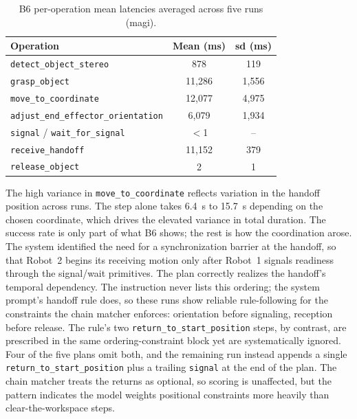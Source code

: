 \begin{table}[t]
	\centering
	\begin{tabular}{lcc}
		\hline
		\textbf{Operation}                           & \textbf{Mean (ms)} & \textbf{\gls{sd} (ms)} \\
		\hline
		\texttt{detect\_object\_stereo}              & 878                & 119                    \\
		\texttt{grasp\_object}                       & 11{,}286           & 1{,}556                \\
		\texttt{move\_to\_coordinate}                & 12{,}077           & 4{,}975                \\
		\texttt{adjust\_end\_effector\_orientation}  & 6{,}079            & 1{,}934                \\
		\texttt{signal} / \texttt{wait\_for\_signal} & $<$1               & –                      \\
		\texttt{receive\_handoff}                    & 11{,}152           & 379                    \\
		\texttt{release\_object}                     & 2                  & 1                      \\
		\hline
	\end{tabular}
	\caption{B6 per-operation mean latencies averaged across five runs (\gls{magi}).}
	\label{tab:b6-latency}
\end{table}

The high variance in \texttt{move\_to\_coordinate} reflects variation in the handoff position across runs. The step alone takes 6.4~s to 15.7~s depending on the chosen coordinate, which drives the elevated variance in total duration. The success rate is only part of what B6 shows; the rest is how the coordination arose. The system identified the need for a synchronization barrier at the handoff, so that Robot~2 begins its receiving motion only after Robot~1 signals readiness through the signal/wait primitives. The plan correctly realizes the handoff’s temporal dependency. The instruction never lists this ordering; the system prompt’s handoff rule does, so these runs show reliable rule-following for the constraints the chain matcher enforces: orientation before signaling, reception before release. The rule’s two \texttt{return\_to\_start\_position} steps, by contrast, are prescribed in the same ordering-constraint block yet are systematically ignored. Four of the five plans omit both, and the remaining run instead appends a single \texttt{return\_to\_start\_position} plus a trailing \texttt{signal} at the end of the plan. The chain matcher treats the returns as optional, so scoring is unaffected, but the pattern indicates the model weights positional constraints more heavily than clear-the-workspace steps.

